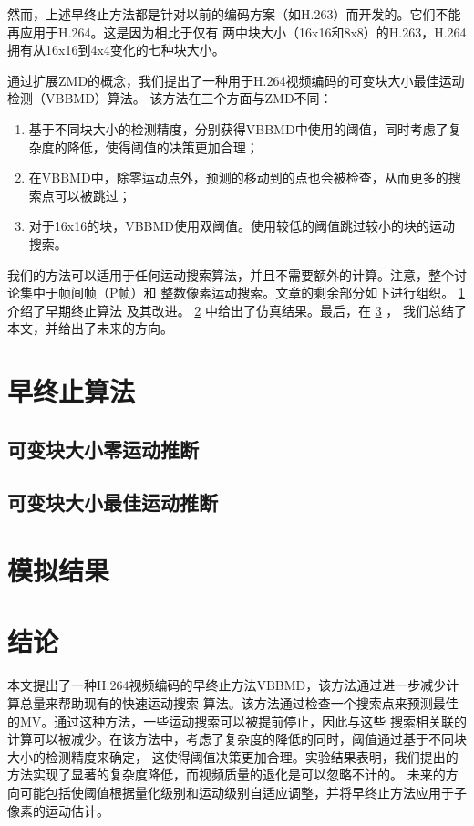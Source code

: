 然而，上述早终止方法都是针对以前的编码方案（如H.263）而开发的。它们不能再应用于H.264。这是因为相比于仅有
两中块大小（16x16和8x8）的H.263，H.264拥有从16x16到4x4变化的七种块大小。

通过扩展ZMD的概念，我们提出了一种用于H.264视频编码的可变块大小最佳运动检测（VBBMD）算法。
该方法在三个方面与ZMD不同：

\begin{enumerate}
  \item 基于不同块大小的检测精度，分别获得VBBMD中使用的阈值，同时考虑了复杂度的降低，使得阈值的决策更加合理；
  \item 在VBBMD中，除零运动点外，预测的移动到的点也会被检查，从而更多的搜索点可以被跳过；
  \item 对于16x16的块，VBBMD使用双阈值。使用较低的阈值跳过较小的块的运动搜索。
\end{enumerate}

我们的方法可以适用于任何运动搜索算法，并且不需要额外的计算。注意，整个讨论集中于帧间帧（P帧）和
整数像素运动搜索。文章的剩余部分如下进行组织。 \ref{sec:app2-early-termination} 介绍了早期终止算法
及其改进。 \ref{sec:app2-sim-result} 中给出了仿真结果。最后，在 \ref{sec:app2-conclusion} ，
我们总结了本文，并给出了未来的方向。

\section{早终止算法}
\label{sec:app2-early-termination}

\subsection{可变块大小零运动推断}

\subsection{可变块大小最佳运动推断}

\section{模拟结果}
\label{sec:app2-sim-result}


\section{结论}
\label{sec:app2-conclusion}


本文提出了一种H.264视频编码的早终止方法VBBMD，该方法通过进一步减少计算总量来帮助现有的快速运动搜索
算法。该方法通过检查一个搜索点来预测最佳的MV。通过这种方法，一些运动搜索可以被提前停止，因此与这些
搜索相关联的计算可以被减少。在该方法中，考虑了复杂度的降低的同时，阈值通过基于不同块大小的检测精度来确定，
这使得阈值决策更加合理。实验结果表明，我们提出的方法实现了显著的复杂度降低，而视频质量的退化是可以忽略不计的。
未来的方向可能包括使阈值根据量化级别和运动级别自适应调整，并将早终止方法应用于子像素的运动估计。
